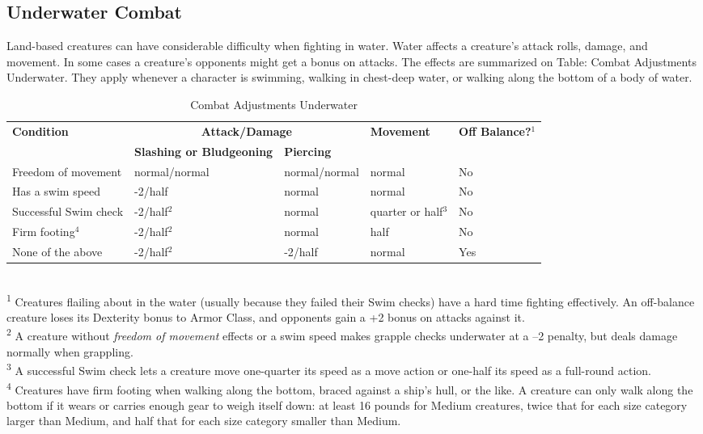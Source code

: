 \subsection{Underwater Combat}

				
Land-based creatures can have considerable difficulty when fighting in water. Water affects a creature's attack rolls, damage, and movement. In some cases a creature's opponents might get a bonus on attacks. The effects are summarized on Table: Combat Adjustments Underwater. They apply whenever a character is swimming, walking in chest-deep water, or walking along the bottom of a body of water. 
				
\begin{table*}[]
\sffamily
\caption{Combat Adjustments Underwater}
\begin{tabular}{lllll}
\textbf{Condition} & \multicolumn{2}{c}{\textbf{Attack/Damage}} & \textbf{Movement} & \textbf{Off Balance?\(^{1}\)}\\
                   & \textbf{Slashing or Bludgeoning} & \textbf{Piercing}\\
Freedom of movement & normal/normal & normal/normal & normal & No\\
Has a swim speed & -2/half & normal & normal & No\\
Successful Swim check& -2/half\(^{2}\) & normal & quarter or half\(^{3 }\) & No\\
Firm footing\(^{4 }\) & -2/half\(^{2}\) & normal & half & No\\
None of the above & -2/half\(^{2}\) &  -2/half & normal & Yes\\
\end{tabular}\\
\textsuperscript{1} Creatures flailing about in the water (usually because they failed their Swim checks) have a hard time fighting effectively. An off-balance creature loses its Dexterity bonus to Armor Class, and opponents gain a +2 bonus on attacks against it. \\
\textsuperscript{2} A creature without \textit{freedom of movement }effects or a swim speed makes grapple checks underwater at a --2 penalty, but deals damage normally when grappling.\\
\textsuperscript{3} A successful Swim check lets a creature move one-quarter its speed as a move action or one-half its speed as a full-round action.\\
\textsuperscript{4} Creatures have firm footing when walking along the bottom, braced against a ship's hull, or the like. A creature can only walk along the bottom if it wears or carries enough gear to weigh itself down: at least 16 pounds for Medium creatures, twice that for each size category larger than Medium, and half that for each size category smaller than Medium. \\
\end{table*}

